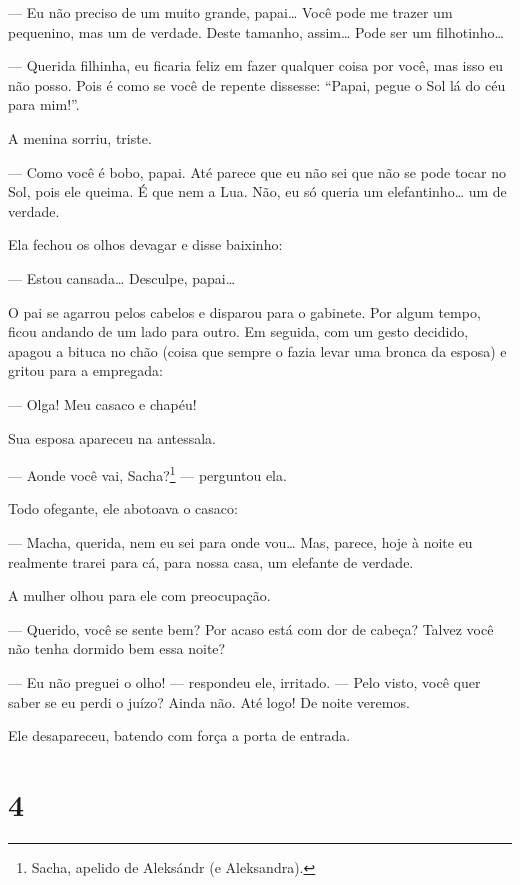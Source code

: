 --- Eu não preciso de um muito grande, papai\ldots{} Você pode me trazer um
pequenino, mas um de verdade. Deste tamanho, assim\ldots{} Pode ser um
filhotinho\ldots{}

--- Querida filhinha, eu ficaria feliz em fazer qualquer coisa por
você, mas isso eu não posso. Pois é como se você de repente dissesse:
``Papai, pegue o Sol lá do céu para mim!''.

A menina sorriu, triste.

--- Como você é bobo, papai. Até parece que eu não sei que não se pode
tocar no Sol, pois ele queima. É que nem a Lua. Não, eu só queria um
elefantinho\ldots{} um de verdade.

Ela fechou os olhos devagar e disse baixinho:

--- Estou cansada\ldots{} Desculpe, papai\ldots{}

O pai se agarrou pelos cabelos e disparou para o gabinete. Por algum
tempo, ficou andando de um lado para outro. Em seguida, com um gesto
decidido, apagou a bituca no chão (coisa que sempre o fazia levar uma
bronca da esposa) e gritou para a empregada:

--- Olga! Meu casaco e chapéu!

Sua esposa apareceu na antessala.

--- Aonde você vai, Sacha?\footnote{Sacha, apelido de Aleksándr (e
  Aleksandra).} --- perguntou ela.

Todo ofegante, ele abotoava o casaco:

--- Macha, querida, nem eu sei para onde vou\ldots{} Mas, parece, hoje à
noite eu realmente trarei para cá, para nossa casa, um elefante de
verdade.

A mulher olhou para ele com preocupação.

--- Querido, você se sente bem? Por acaso está com dor de cabeça? Talvez
você não tenha dormido bem essa noite?

--- Eu não preguei o olho! --- respondeu ele, irritado. --- Pelo visto,
você quer saber se eu perdi o juízo? Ainda não. Até logo! De noite
veremos.

Ele desapareceu, batendo com força a porta de entrada.

\section{4}


